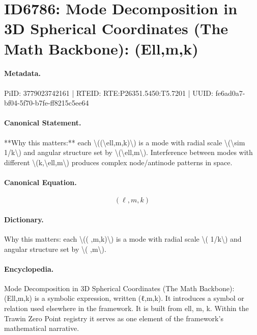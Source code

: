 \section*{ID6786: Mode Decomposition in 3D Spherical Coordinates (The Math Backbone): (Ell,m,k)}
\paragraph{Metadata.}
PiID: 3779023742161 | RTEID: RTE:P26351.5450:T5.7201 | UUID: fe6ad0a7-bf04-5f70-b7fe-ff8215c5ee64

\paragraph{Canonical Statement.}
**Why this matters:** each \textbackslash{}((\textbackslash{}ell,m,k)\textbackslash{}) is a mode with radial scale \textbackslash{}(\textbackslash{}sim 1/k\textbackslash{}) and angular structure set by \textbackslash{}(\textbackslash{}ell,m\textbackslash{}). Interference between modes with different \textbackslash{}(k,\textbackslash{}ell,m\textbackslash{}) produces complex node/antinode patterns in space.

\paragraph{Canonical Equation.}
\[
(\ell,m,k)
\]

\paragraph{Dictionary.}
Why this matters: each \textbackslash{}(( ,m,k)\textbackslash{}) is a mode with radial scale \textbackslash{}( 1/k\textbackslash{}) and angular structure set by \textbackslash{}( ,m\textbackslash{}).

\paragraph{Encyclopedia.}
Mode Decomposition in 3D Spherical Coordinates (The Math Backbone): (Ell,m,k) is a symbolic expression, written (ℓ,m,k). It introduces a symbol or relation used elsewhere in the framework. It is built from ell, m, k. Within the Trawin Zero Point registry it serves as one element of the framework's mathematical narrative.

